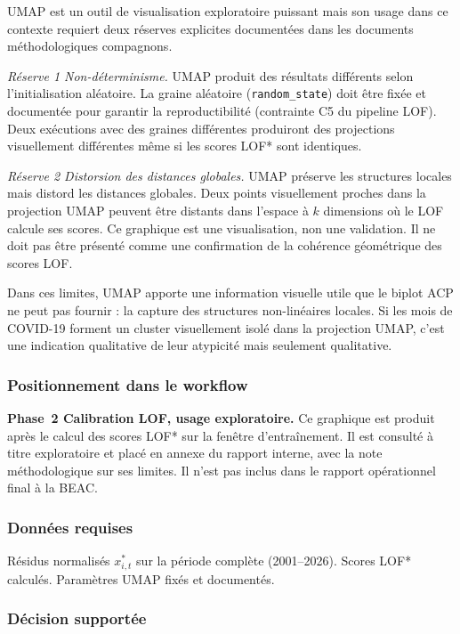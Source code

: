 \documentclass[12pt,a4paper]{article}
\begin{document}
UMAP est un outil de visualisation exploratoire puissant mais son usage
dans ce contexte requiert deux réserves explicites documentées dans les
documents méthodologiques compagnons.

\textit{Réserve 1  Non-déterminisme.} UMAP produit des résultats
différents selon l'initialisation aléatoire. La graine aléatoire
(\texttt{random\_state}) doit être fixée et documentée pour garantir la
reproductibilité (contrainte C5 du pipeline LOF). Deux exécutions avec
des graines différentes produiront des projections visuellement différentes
même si les scores LOF* sont identiques.

\textit{Réserve 2  Distorsion des distances globales.} UMAP préserve
les structures locales mais distord les distances globales. Deux points
visuellement proches dans la projection UMAP peuvent être distants dans
l'espace à $k$ dimensions où le LOF calcule ses scores. Ce graphique
est une visualisation, non une validation. Il ne doit pas être présenté
comme une confirmation de la cohérence géométrique des scores LOF.

Dans ces limites, UMAP apporte une information visuelle utile que le biplot
ACP ne peut pas fournir : la capture des structures non-linéaires locales.
Si les mois de COVID-19 forment un cluster visuellement isolé dans la
projection UMAP, c'est une indication qualitative de leur atypicité 
mais seulement qualitative.

\subsubsection{Positionnement dans le workflow}

\textbf{Phase~2  Calibration LOF, usage exploratoire.} Ce graphique est
produit après le calcul des scores LOF* sur la fenêtre d'entraînement. Il
est consulté à titre exploratoire et placé en annexe du rapport interne,
avec la note méthodologique sur ses limites. Il n'est pas inclus dans le
rapport opérationnel final à la BEAC.

\subsubsection{Données requises}

Résidus normalisés $x_{i,t}^*$ sur la période complète (2001--2026).
Scores LOF* calculés. Paramètres UMAP fixés et documentés.

\subsubsection{Décision supportée}
\end{document}
